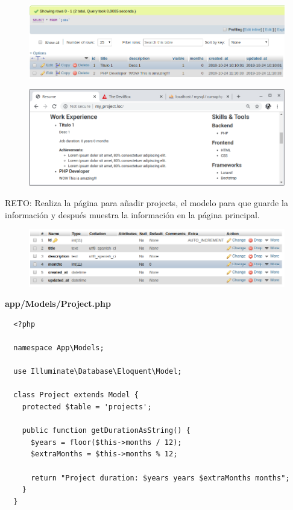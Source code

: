 \documentclass{article}
\begin{document}
\begin{figure}[h!]
  \centering
  \includegraphics[scale=0.5]{./Pictures/093_bd.png}
\end{figure}

\begin{figure}[h!]
  \centering
  \includegraphics[scale=0.5]{./Pictures/094_listar_funcional.png}
\end{figure}

RETO: Realiza la página para añadir projects, el modelo para que guarde la
información y después muestra la información en la página principal.\\

\begin{figure}[h!]
  \centering
  \includegraphics[scale=0.5]{./Pictures/095_projects.png}
\end{figure}

\textbf{app/Models/Project.php}
\begin{verbatim}
  <?php

  namespace App\Models;

  use Illuminate\Database\Eloquent\Model;

  class Project extends Model {
    protected $table = 'projects';

    public function getDurationAsString() {
      $years = floor($this->months / 12);
      $extraMonths = $this->months % 12;

      return "Project duration: $years years $extraMonths months";
    }
  }
\end{verbatim}
\end{document}
